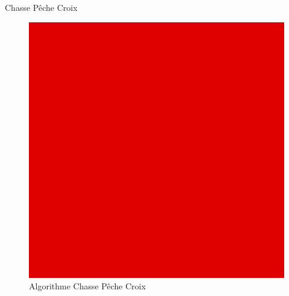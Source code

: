 	\begin{frame}{Chasse Pêche Croix}
		\begin{figure}
		    \centering
		    \includegraphics[width=.5\linewidth]{images/TODO.png}
		    \caption*{Algorithme Chasse Pêche Croix}
		    \label{fig:CPC}
		\end{figure}{}
	\end{frame}
	
